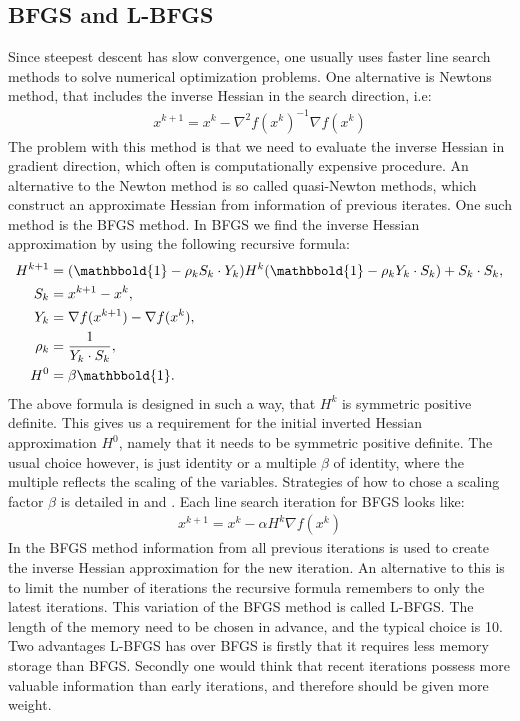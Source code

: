 \subsection{BFGS and L-BFGS}
Since steepest descent has slow convergence, one usually uses faster line search methods to solve numerical optimization problems. One alternative is Newtons method, that includes the inverse Hessian in the search direction, i.e:
\begin{align}
x^{k+1} = x^k - \nabla^2 f(x^k)^{-1}\nabla f(x^k) \label{Newton}
\end{align}
The problem with this method is that we need to evaluate the inverse Hessian in gradient direction, which often is computationally expensive procedure. An alternative to the Newton method is so called quasi-Newton methods, which construct an approximate Hessian from information of previous iterates. One such method is the BFGS method\cite{broyden1970convergence,fletcher1970new,goldfarb1970family, shanno1970conditioning}. In BFGS we find the inverse Hessian approximation by using the following recursive formula:
\begin{align*}
H^{k+1} &= (\mathbbold{1}-\rho_kS_k\cdot Y_k)H^k(\mathbbold{1} -\rho_kY_k\cdot S_k) + S_k\cdot S_k, \\
S_k &= x^{k+1}-x^{k}, \\
Y_k &= \nabla f(x^{k+1})-\nabla f(x^{k}),\\
\rho_k &= \frac{1}{Y_k\cdot S_k}, \\
H^0&=\beta\mathbbold{1}.
\end{align*}
The above formula is designed in such a way, that $H^k$ is symmetric positive definite. This gives us a requirement for the initial inverted Hessian approximation $H^0$, namely that it needs to be symmetric positive definite. The usual choice however, is just identity or a multiple $\beta$ of identity, where the multiple reflects the scaling of the variables. Strategies of how to chose a scaling factor $\beta$ is detailed in \cite{liu1989limited} and  \cite{gilbert1989some}. Each line search iteration for BFGS looks like:
\begin{align*}
x^{k+1} = x^k - \alpha H^{k}\nabla f(x^k)
\end{align*} 
In the BFGS method information from all previous iterations is used to create the inverse Hessian approximation for the new iteration. An alternative to this is to limit the number of iterations the recursive formula remembers to only the latest iterations. This variation of the BFGS method is called L-BFGS\cite{nocedal1980updating}. The length of the memory need to be chosen in advance, and the typical choice is 10. Two advantages L-BFGS has over BFGS is firstly that it requires less memory storage than BFGS. Secondly one would think that recent iterations possess more valuable information than early iterations, and therefore should be given more weight. 
